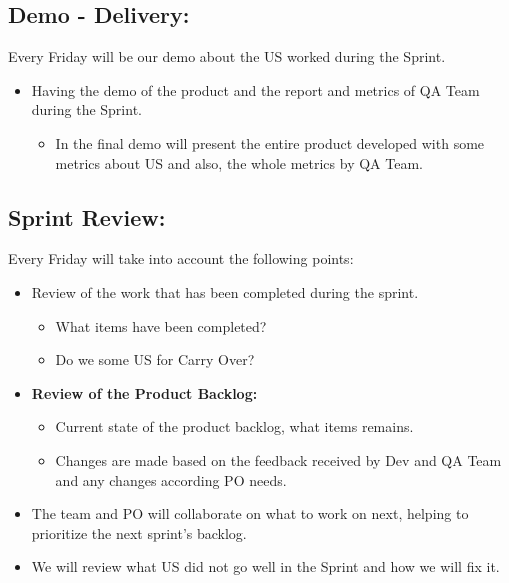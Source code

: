 \documentclass{article}
\providecommand{\tightlist}{
  \setlength{\itemsep}{0pt}\setlength{\parskip}{0pt}}
\begin{document}
\hypertarget{demodelivery}{
\subsection{Demo - Delivery:}\label{demodelivery}}

Every Friday will be our demo about the US worked during the Sprint.

\begin{itemize}
\tightlist
\item
  Having the demo of the product and the report and metrics of QA Team
  during the Sprint.

  \begin{itemize}
  \tightlist
  \item
    In the final demo will present the entire product developed with
    some metrics about US and also, the whole metrics by QA Team.
  \end{itemize}
\end{itemize}

\hypertarget{sprintreview}{
\subsection{Sprint Review:}\label{sprintreview}}

Every Friday will take into account the following points:

\begin{itemize}
\tightlist
\item
  Review of the work that has been completed during the sprint.

  \begin{itemize}
  \tightlist
  \item
    What items have been completed?
  \item
    Do we some US for Carry Over?
  \end{itemize}
\item
  \textbf{Review of the Product Backlog:}

  \begin{itemize}
  \tightlist
  \item
    Current state of the product backlog, what items remains.
  \item
    Changes are made based on the feedback received by Dev and QA Team
    and any changes according PO needs.
  \end{itemize}
\item
  The team and PO will collaborate on what to work on next, helping to
  prioritize the next sprint's backlog.
\item
  We will review what US did not go well in the Sprint and how we will
  fix it.
\end{itemize}
\end{document}
